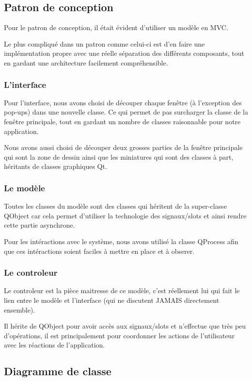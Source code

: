 \subsection{Patron de conception}

Pour le patron de conception, il était évident d'utiliser un modèle en MVC.

Le plus compliqué dans un patron comme celui-ci est d'en faire une implémentation propre avec une réelle séparation des différents composants, tout en gardant une architecture facilement compréhensible.

\subsubsection{L'interface}

Pour l'interface, nous avons choisi de découper chaque fenêtre (à l'exception des pop-ups) dans une nouvelle classe. Ce qui permet 
de pas surcharger la classe de la fenêtre principale, tout en gardant un nombre de classes raisonnable pour notre application.

Nous avons aussi choisi de découper deux grosses parties de la fenêtre principale qui sont la zone de dessin ainsi que les miniatures qui sont des classes à part, héritants de classes graphiques Qt.

\subsubsection{Le modèle}

Toutes les classes du modèle sont des classes qui héritent de la super-classe QObject car cela permet d'utiliser la technologie des  signaux/slots et ainsi rendre cette partie asynchrone.

Pour les intéractions avec le système, nous avons utilisé la classe QProcess afin que ces intéractions soient faciles à mettre en place et à obserer.

\subsubsection{Le controleur}

Le controleur est la pièce maitresse de ce modèle, c'est réellement lui qui fait le lien entre le modèle et l'interface (qui ne discutent JAMAIS directement ensemble).

Il hérite de QObject pour avoir accès aux signaux/slots et n'effectue que très peu d'opérations, il est principalement pour coordonner les actions de l'utilisateur avec les réactions de l'application.

\subsection{Diagramme de classe}

